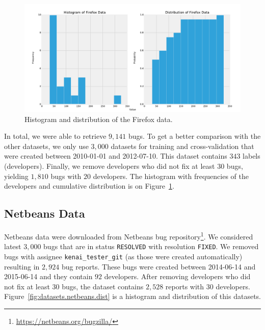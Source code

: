 \begin{figure}[htbp]
    \centering
        \includegraphics[width=\textwidth]{./images/distribution/firefox.pdf}
    \caption{Histogram and distribution of the Firefox data.}
    \label{fig:datasets.firefox.dist}
\end{figure}

In total, we were able to retrieve $9,141$ bugs. To get a better comparison with the other datasets, we only use $3,000$ datasets for training and cross-validation that were created between 2010-01-01 and 2012-07-10. This dataset contains $343$ labels (developers). Finally, we remove developers who did not fix at least $30$ bugs, yielding $1,810$ bugs with $20$ developers. The histogram with frequencies of the developers and cumulative distribution is on Figure~\ref{fig:datasets.firefox.dist}.

\subsection{Netbeans Data}

Netbeans data were downloaded from Netbeans bug repository\footnote{\url{https://netbeans.org/bugzilla/}}. We considered latest $3,000$ bugs that are in status \texttt{RESOLVED} with resolution \texttt{FIXED}. We removed bugs with assignee \texttt{kenai\_tester\_git} (as those were created automatically) resulting in $2,924$ bug reports. These bugs were created between 2014-06-14 and 2015-06-14 and they contain $92$ developers. After removing developers who did not fix at least 30 bugs, the dataset contains $2,528$ reports with $30$ developers. Figure~\ref{fig:datasets.netbeans.dist} is a histogram and distribution of this datasets.

